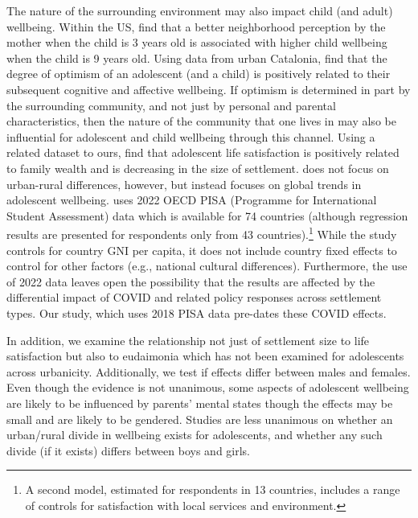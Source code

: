 \documentclass[10pt, letterpaper]{article}
\begin{document}
\begin{spacing}{1.4}
The nature of the surrounding environment may also impact child (and adult) wellbeing. Within the US, \citet{fava2022} find that a better neighborhood perception by the mother when the child is 3 years old is associated with higher child wellbeing when the child is 9 years old. Using data from urban Catalonia, \citet{oriol2023} find that the degree of optimism of an adolescent (and a child) is positively related to their subsequent cognitive and affective wellbeing. If optimism is determined in part by the surrounding community, and not just by personal and parental characteristics, then the nature of the community that one lives in may also be influential for adolescent and child wellbeing through this channel. 
Using a related dataset to ours, \citet{marquez24} find that adolescent life satisfaction is positively
related to family wealth and is decreasing in the size of
settlement. \citet{marquez24} does not focus on urban-rural differences,
however, but instead focuses on global trends in adolescent wellbeing.  
 \citet{marquez24} uses 2022 OECD PISA (Programme for
International Student Assessment) data which is available for 74 countries (although regression results are
presented for respondents only from 43 countries).\footnote{A second model, estimated for respondents in 13 countries, includes a range of controls
  for satisfaction with local services and environment.}
While the study controls for country GNI per capita, it does
not include country fixed effects to control for other factors (e.g., national cultural differences). Furthermore,
the use of 2022 data leaves open the possibility that the results are affected by the differential impact of COVID
and related policy responses across settlement types.
Our study, which uses 2018 PISA data pre-dates these COVID effects.

In addition,
we examine the relationship not just of settlement size to life satisfaction but
also to eudaimonia which has not been examined for adolescents across
urbanicity. Additionally, we test if effects differ between males and
females. Even though the evidence is not unanimous, some aspects of adolescent
wellbeing are likely to be influenced by parents' mental states though the
effects may be small and are likely to be gendered. Studies are less unanimous
on whether an urban/rural divide in wellbeing exists for adolescents, and
whether any such divide (if it exists) differs between boys and girls.


\end{spacing}
\end{document}
